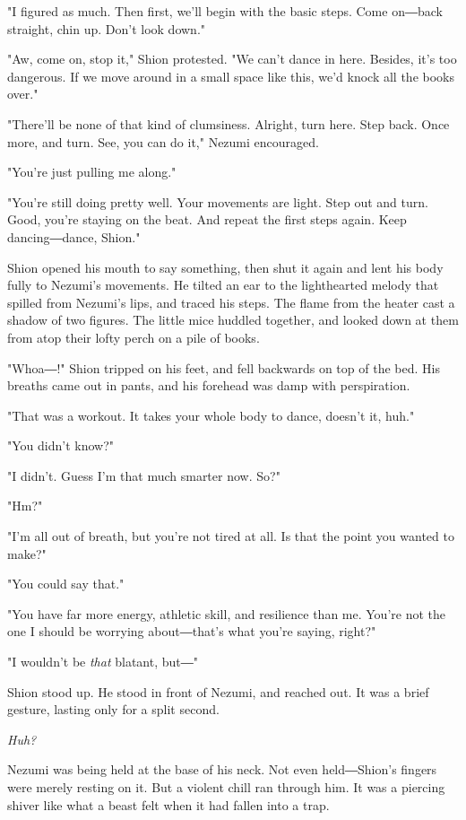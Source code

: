 "I figured as much. Then first, we'll begin with the basic steps. Come
on―back straight, chin up. Don't look down."

"Aw, come on, stop it," Shion protested. "We can't dance in here.
Besides, it's too dangerous. If we move around in a small space like
this, we'd knock all the books over."

"There'll be none of that kind of clumsiness. Alright, turn here. Step
back. Once more, and turn. See, you can do it," Nezumi encouraged.

"You're just pulling me along."

"You're still doing pretty well. Your movements are light. Step out and
turn. Good, you're staying on the beat. And repeat the first steps
again. Keep dancing―dance, Shion."

Shion opened his mouth to say something, then shut it again and lent his
body fully to Nezumi's movements. He tilted an ear to the lighthearted
melody that spilled from Nezumi's lips, and traced his steps. The flame
from the heater cast a shadow of two figures. The little mice huddled
together, and looked down at them from atop their lofty perch on a pile
of books.

"Whoa―!" Shion tripped on his feet, and fell backwards on top of the
bed. His breaths came out in pants, and his forehead was damp with
perspiration.

"That was a workout. It takes your whole body to dance, doesn't it,
huh."

"You didn't know?"

"I didn't. Guess I'm that much smarter now. So?"

"Hm?"

"I'm all out of breath, but you're not tired at all. Is that the point
you wanted to make?"

"You could say that."

"You have far more energy, athletic skill, and resilience than me.
You're not the one I should be worrying about―that's what you're saying,
right?"

"I wouldn't be \emph{that} blatant, but―"

Shion stood up. He stood in front of Nezumi, and reached out. It was a
brief gesture, lasting only for a split second.

\emph{Huh?}

Nezumi was being held at the base of his neck. Not even held―Shion's
fingers were merely resting on it. But a violent chill ran through him.
It was a piercing shiver like what a beast felt when it had fallen into
a trap.

